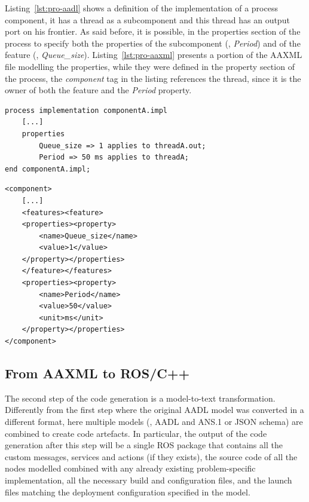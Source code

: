 Listing~\ref{lst:pro-aadl} shows a definition of the implementation of a process component, it has a thread as a subcomponent and this thread has an output port on his frontier. As said before, it is possible, in the properties section of the process to specify both the properties of the subcomponent (\ie, \textit{Period}) and of the feature (\ie, \textit{Queue\_size}). Listing~\ref{lst:pro-aaxml} presents a portion of the AAXML file modelling the properties, while they were defined in the property section of the process, the \textit{component} tag in the listing references the thread, since it is the owner of both the feature and the \textit{Period} property. 

\begin{lstlisting}[frame=tb,caption={TODO caption},label=lst:pro-aadl]
process implementation componentA.impl
	[...]
	properties
		Queue_size => 1 applies to threadA.out;
		Period => 50 ms applies to threadA;
end componentA.impl;
\end{lstlisting}

\begin{lstlisting}[frame=tb,caption={TODO caption},label=lst:pro-aaxml]
<component>
	[...]
	<features><feature>
	<properties><property>
		<name>Queue_size</name>
		<value>1</value>
	</property></properties>
	</feature></features>
	<properties><property>
		<name>Period</name>
		<value>50</value>
		<unit>ms</unit>
	</property></properties>
</component>
\end{lstlisting}

\subsection{From AAXML to ROS/C++}
\label{sec:xml-cpp}
The second step of the code generation is a model-to-text transformation. Differently from the first step where the original AADL model was converted in a different format, here multiple models (\ie, AADL and ANS.1 or JSON schema) are combined to create code artefacts. In particular, the output of the code generation after this step will be a single ROS package that contains all the custom messages, services and actions (if they exists), the source code of all the nodes modelled combined with any already existing problem-specific implementation, all the necessary build and configuration files, and the launch files matching the deployment configuration specified in the model.

